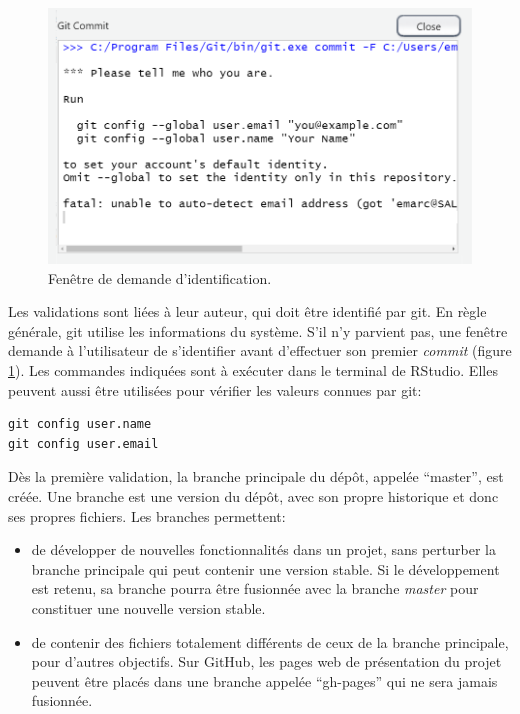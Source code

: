 \documentclass[
  12pt,
  french,
  a4paper,
  extrafontsizes,onecolumn,openright
  ]{memoir}
\providecommand{\tightlist}{%
  \setlength{\itemsep}{0pt}\setlength{\parskip}{0pt}}
\begin{document}
\scriptsize

\begin{figure}

{\centering \includegraphics[width=0.8\linewidth]{images/git-id} 

}

\caption{Fenêtre de demande d'identification.}\label{fig:git-id}
\end{figure}

\normalsize

Les validations sont liées à leur auteur, qui doit être identifié par git.
En règle générale, git utilise les informations du système.
S'il n'y parvient pas, une fenêtre demande à l'utilisateur de s'identifier avant d'effectuer son premier \emph{commit} (figure \ref{fig:git-id}).
Les commandes indiquées sont à exécuter dans le terminal de RStudio.
Elles peuvent aussi être utilisées pour vérifier les valeurs connues par git:

\begin{verbatim}
git config user.name
git config user.email
\end{verbatim}

Dès la première validation, la branche principale du dépôt, appelée \enquote{master}, est créée.
Une branche est une version du dépôt, avec son propre historique et donc ses propres fichiers.
Les branches permettent:

\begin{itemize}
\tightlist
\item
  de développer de nouvelles fonctionnalités dans un projet, sans perturber la branche principale qui peut contenir une version stable.
  Si le développement est retenu, sa branche pourra être fusionnée avec la branche \emph{master} pour constituer une nouvelle version stable.
\item
  de contenir des fichiers totalement différents de ceux de la branche principale, pour d'autres objectifs.
  Sur GitHub, les pages web de présentation du projet peuvent être placés dans une branche appelée \enquote{gh-pages} qui ne sera jamais fusionnée.
\end{itemize}
\end{document}
